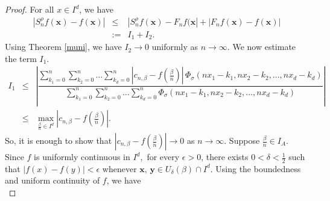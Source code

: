 \documentclass[12pt, reqno]{amsart}
\numberwithin{equation}{section}
\theoremstyle{definition}
\theoremstyle{remark}
\numberwithin{equation}{section}
\newcommand{\X}{\mathbf{x}}
\begin{document}
\begin{proof}
    For all $x\in I^d$, we have
\begin{eqnarray*}
|S^{\rho}_nf(\X)-f(\X)|
&\leq& |S^{\rho}_nf(\X)-F_nf(\X| + |F_nf(\X)-f(\X)|\\
&:=& I_1 + I_2.
\end{eqnarray*}
Using Theorem \ref{muni}, we have $I_2\to 0$ uniformly as $n\to\infty$. We now estimate the term $I_1.$
 \begin{eqnarray*}
     I_1 &\leq& \left|\displaystyle{\dfrac{\sum_{k_1=0}^n\sum_{k_2=0}^n\ldots\sum_{k_d=0}^n\left|c_{n,\beta}-f\left(\frac{\beta}{n}\right)\right|\,\Phi_\sigma(nx_1-k_1,nx_2-k_2,\ldots,nx_d-k_d)}{\sum_{k_1=0}^n\sum_{k_2=0}^n\ldots\sum_{k_d=0}^n\Phi_\sigma(nx_1-k_1,nx_2-k_2,\ldots,nx_d-k_d)}}\right| \\
     &\leq& \max_{\frac{\beta}{n}\in I^d} \left|c_{n,\beta}-f\left(\frac{\beta}{n}\right)\right|.
 \end{eqnarray*}
 So, it is enough to show that $\left|c_{n,\beta}-f\left(\frac{\beta}{n}\right)\right|\to0$ as $n\to\infty.$ Suppose $\frac{\beta}{n}\in I_A.$
 Since $f$ is uniformly continuous in $I^d,$ for every $\epsilon>0$, there exists $0<\delta<\frac{1}{2}$ such that $|f(x)-f(y)|<\epsilon$ whenever $\displaystyle \X,\,\mathbf{y}\in U_{\delta}(\beta)\cap I^d.$ Using the boundedness and uniform continuity of $f$, we have \\


\end{proof}
\end{document}
